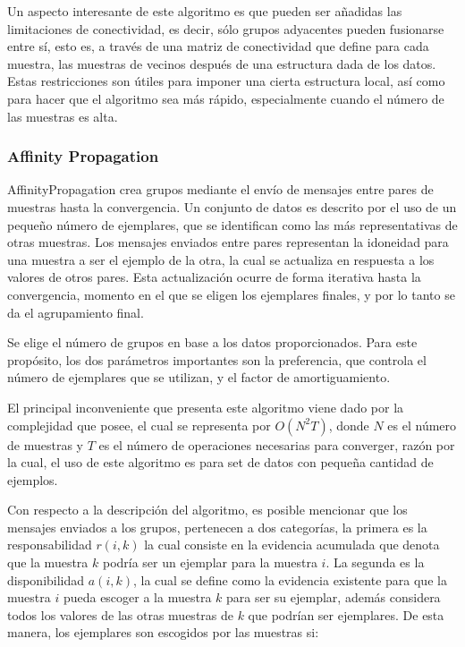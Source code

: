 Un aspecto interesante de este algoritmo es que pueden ser añadidas las limitaciones de conectividad, es decir, sólo grupos adyacentes pueden fusionarse entre sí, esto es, a través de una matriz de conectividad que define para cada muestra, las muestras de vecinos después de una estructura dada de los datos. Estas restricciones son útiles para imponer una cierta estructura local, así como para hacer que el algoritmo sea más rápido, especialmente cuando el número de las muestras es alta.

\subsubsection{Affinity Propagation}

AffinityPropagation crea grupos mediante el envío de mensajes entre pares de muestras hasta la convergencia. Un conjunto de datos es descrito por el uso de un pequeño número de ejemplares, que se identifican como las más representativas de otras muestras. Los mensajes enviados entre pares representan la idoneidad para una muestra a ser el ejemplo de la otra, la cual se actualiza en respuesta a los valores de otros pares. Esta actualización ocurre de forma iterativa hasta la convergencia, momento en el que se eligen los ejemplares finales, y por lo tanto se da el agrupamiento final.

Se elige el número de grupos en base a los datos proporcionados. Para este propósito, los dos parámetros importantes son la preferencia, que controla el número de ejemplares que se utilizan, y el factor de amortiguamiento.

El principal inconveniente que presenta este algoritmo viene dado por la complejidad que posee, el cual se representa por $O(N^{2}T)$, donde $N$ es el número de muestras y $T$ es el número de operaciones necesarias para converger, razón por la cual, el uso de este algoritmo es para set de datos con pequeña cantidad de ejemplos.

Con respecto a la descripción del algoritmo, es posible mencionar que los mensajes enviados a los grupos, pertenecen a dos categorías, la primera es la responsabilidad $r(i,k)$ la cual consiste en la evidencia acumulada que denota que la muestra $k$ podría ser un ejemplar para la muestra $i$. La segunda es la disponibilidad $a(i,k)$, la cual se define como la evidencia existente para que la muestra $i$ pueda escoger a la muestra $k$ para ser su ejemplar, además considera todos los valores de las otras muestras de $k$ que podrían ser ejemplares. De esta manera, los ejemplares son escogidos por las muestras si:

